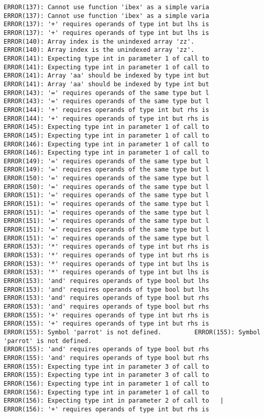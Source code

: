 \documentclass[12pt]{book}
\begin{document}
\begin{lstlisting}
ERROR(137): Cannot use function 'ibex' as a simple varia	ERROR(137): Cannot use function 'ibex' as a simple varia
ERROR(137): '+' requires operands of type int but lhs is	ERROR(137): '+' requires operands of type int but lhs is
ERROR(140): Array index is the unindexed array 'zz'.		ERROR(140): Array index is the unindexed array 'zz'.
ERROR(141): Expecting type int in parameter 1 of call to	ERROR(141): Expecting type int in parameter 1 of call to
ERROR(141): Array 'aa' should be indexed by type int but	ERROR(141): Array 'aa' should be indexed by type int but
ERROR(143): '=' requires operands of the same type but l	ERROR(143): '=' requires operands of the same type but l
ERROR(144): '+' requires operands of type int but rhs is	ERROR(144): '+' requires operands of type int but rhs is
ERROR(145): Expecting type int in parameter 1 of call to	ERROR(145): Expecting type int in parameter 1 of call to
ERROR(146): Expecting type int in parameter 1 of call to	ERROR(146): Expecting type int in parameter 1 of call to
ERROR(149): '=' requires operands of the same type but l	ERROR(149): '=' requires operands of the same type but l
ERROR(150): '=' requires operands of the same type but l	ERROR(150): '=' requires operands of the same type but l
ERROR(151): '=' requires operands of the same type but l	ERROR(151): '=' requires operands of the same type but l
ERROR(151): '=' requires operands of the same type but l	ERROR(151): '=' requires operands of the same type but l
ERROR(151): '=' requires operands of the same type but l	ERROR(151): '=' requires operands of the same type but l
ERROR(153): '*' requires operands of type int but rhs is	ERROR(153): '*' requires operands of type int but rhs is
ERROR(153): '*' requires operands of type int but lhs is	ERROR(153): '*' requires operands of type int but lhs is
ERROR(153): 'and' requires operands of type bool but lhs	ERROR(153): 'and' requires operands of type bool but lhs
ERROR(153): 'and' requires operands of type bool but rhs	ERROR(153): 'and' requires operands of type bool but rhs
ERROR(155): '+' requires operands of type int but rhs is	ERROR(155): '+' requires operands of type int but rhs is
ERROR(155): Symbol 'parrot' is not defined.			ERROR(155): Symbol 'parrot' is not defined.
ERROR(155): 'and' requires operands of type bool but rhs	ERROR(155): 'and' requires operands of type bool but rhs
ERROR(155): Expecting type int in parameter 3 of call to	ERROR(155): Expecting type int in parameter 3 of call to
ERROR(156): Expecting type int in parameter 1 of call to	ERROR(156): Expecting type int in parameter 1 of call to
ERROR(156): Expecting type int in parameter 2 of call to   |	ERROR(156): '+' requires operands of type int but rhs is

\end{lstlisting}
\end{document}
